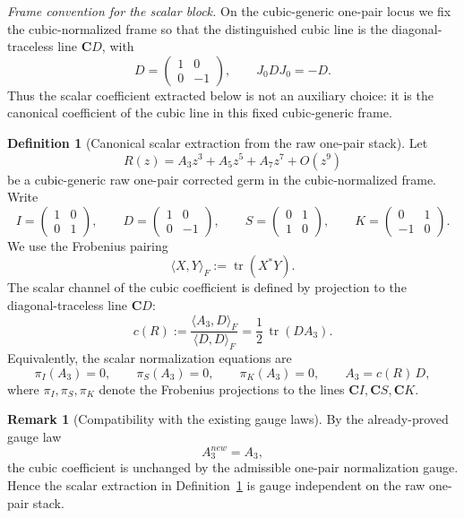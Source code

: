 \documentclass[11pt,a4paper]{amsart}
\def\new{new}%
\theoremstyle{plain}
\theoremstyle{definition}
\newtheorem{definition}[theorem]{Definition}
\newtheorem{remark}[theorem]{Remark}
\newcommand{\new}{\mathrm{new}}
\begin{document}
\noindent\emph{Frame convention for the scalar block.}
On the cubic-generic one-pair locus we fix the cubic-normalized frame so that
the distinguished cubic line is the diagonal-traceless line $\mathbf C D$,
with
\[
D=\begin{pmatrix}1&0\\0&-1\end{pmatrix},
\qquad
J_0DJ_0=-D.
\]
Thus the scalar coefficient extracted below is not an auxiliary choice: it is
the canonical coefficient of the cubic line in this fixed cubic-generic frame.

\begin{definition}[Canonical scalar extraction from the raw one-pair stack]
\label{def:canonical-scalar-extraction-raw-one-pair}
Let
\[
R(z)=A_3 z^3 + A_5 z^5 + A_7 z^7 + O(z^9)
\]
be a cubic-generic raw one-pair corrected germ in the cubic-normalized frame.
Write
\[
I=\begin{pmatrix}1&0\\0&1\end{pmatrix},\qquad
D=\begin{pmatrix}1&0\\0&-1\end{pmatrix},\qquad
S=\begin{pmatrix}0&1\\1&0\end{pmatrix},\qquad
K=\begin{pmatrix}0&1\\-1&0\end{pmatrix}.
\]
We use the Frobenius pairing
\[
\langle X,Y\rangle_F:=\operatorname{tr}(X^\ast Y).
\]
The scalar channel of the cubic coefficient is defined by projection to the
diagonal-traceless line $\mathbf C D$:
\[
c(R):=\frac{\langle A_3,D\rangle_F}{\langle D,D\rangle_F}
      =\frac12\,\operatorname{tr}(D A_3).
\]
Equivalently, the scalar normalization equations are
\[
\pi_I(A_3)=0,\qquad
\pi_S(A_3)=0,\qquad
\pi_K(A_3)=0,\qquad
A_3=c(R)\,D,
\]
where $\pi_I,\pi_S,\pi_K$ denote the Frobenius projections to the lines
$\mathbf C I,\mathbf C S,\mathbf C K$.
\end{definition}

\begin{remark}[Compatibility with the existing gauge laws]
\label{rem:scalar-extraction-compatible-with-gauge-laws}
By the already-proved gauge law
\[
A_3^{\new}=A_3,
\]
the cubic coefficient is unchanged by the admissible one-pair normalization
gauge. Hence the scalar extraction in
Definition~\ref{def:canonical-scalar-extraction-raw-one-pair} is gauge
independent on the raw one-pair stack.
\end{remark}
\end{document}
